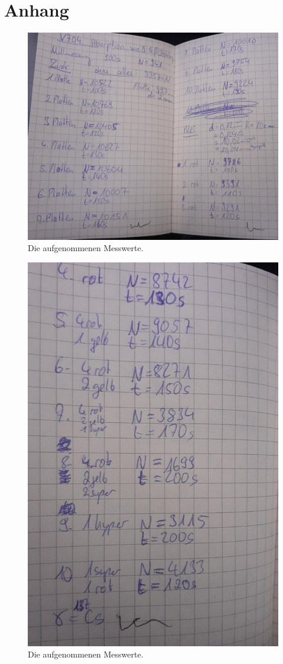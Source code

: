 \section{Anhang}
\label{sec:anhang}

\begin{figure}[H]
  \centering
  \includegraphics[width=12cm]{content/mess1.jpg}
  \caption{Die aufgenommenen Messwerte.}
  \label{fig:mess1}
\end{figure}
\begin{figure}[H]
  \centering
  \includegraphics[width=12cm]{content/mess2.jpg}
  \caption{Die aufgenommenen Messwerte.}
  \label{fig:mess2}
\end{figure}
